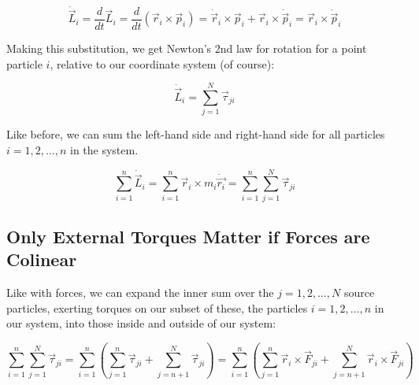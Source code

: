 \documentclass[10pt]{article}
\begin{document}
\begin{equation*}
    \dot{\vec{L}}_i = 
        \frac{d}{dt}\vec{L}_i = \frac{d}{dt}(\vec{r}_i\times\vec{p}_i) = 
        \dot{\vec{r}}_i\times\vec{p}_i + \vec{r}_i\times\dot{\vec{p}}_i = 
        \vec{r}_i\times\dot{\vec{p}}_i 
\end{equation*}

Making this substitution, we get Newton's 2nd law for rotation 
for a point particle $i$, 
relative to our coordinate system (of course):

\begin{equation} \label{t2}
    \dot{\vec{L}}_i = \sum_{j=1}^N\vec{\tau}_{ji}
\end{equation}

Like before, we can sum the left-hand side and right-hand side for all 
particles $i = 1,2,\ldots,n$ in the system.

\begin{equation}
    \sum_{i=1}^n\dot{\vec{L}}_i = 
        \sum_{i=1}^n\vec{r}_i\times m_i\ddot{\vec{r_i}} = 
        \sum_{i=1}^n\sum_{j=1}^N\vec{\tau}_{ji} \label{r2m}
\end{equation}

\subsection{Only External Torques Matter if Forces are Colinear}

Like with forces, we can expand the inner sum over the $j=1,2,\ldots,N$ 
source particles, exerting torques on our subset of these, 
the particles $i=1,2,\ldots,n$ in our system, into those inside and 
outside of our system:

\begin{equation*}
    \sum_{i=1}^n\sum_{j=1}^N\vec{\tau}_{ji} = \sum_{i=1}^n\left(
        \sum_{j=1}^n\vec{\tau}_{ji} + \sum_{j=n+1}^N\vec{\tau}_{ji}\right) = 
        \sum_{i=1}^n\left(\sum_{j=1}^n\vec{r}_i\times\vec{F}_{ji} 
        + \sum_{j=n+1}^N\vec{r}_i\times\vec{F}_{ji}\right) 
\end{equation*}
\end{document}
